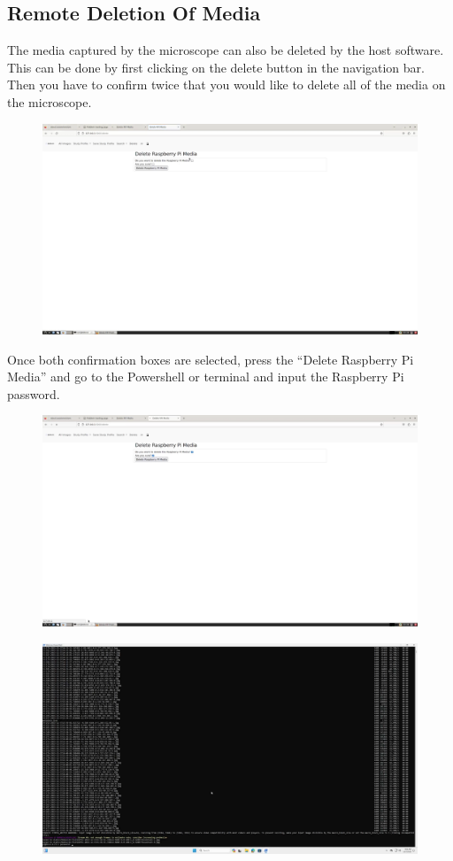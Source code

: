 \documentclass[12pt]{article}
\begin{document}
\begin{center}
	\subsection{Remote Deletion Of Media}
	The media captured by the microscope can also be deleted by the host software. This can be done by first clicking on the delete button in the navigation bar. Then you have to confirm twice that you would like to delete all of the media on the microscope.
	\begin{figure}[H]
		\includegraphics[width=\textwidth]{Figures/Remote-Delete.png}
	\end{figure}
	Once both confirmation boxes are selected, press the ``Delete Raspberry Pi Media'' and go to the Powershell or terminal and input the Raspberry Pi password.
	\begin{figure}[H]
		\includegraphics[width=\textwidth]{Figures/Remote-Delete-Confirm.png}
	\end{figure}
	\begin{figure}[H]
		\includegraphics[width=\textwidth]{Figures/Save-Study-Profile-SSH-Password.png}
	\end{figure}

\end{center}
\end{document}

